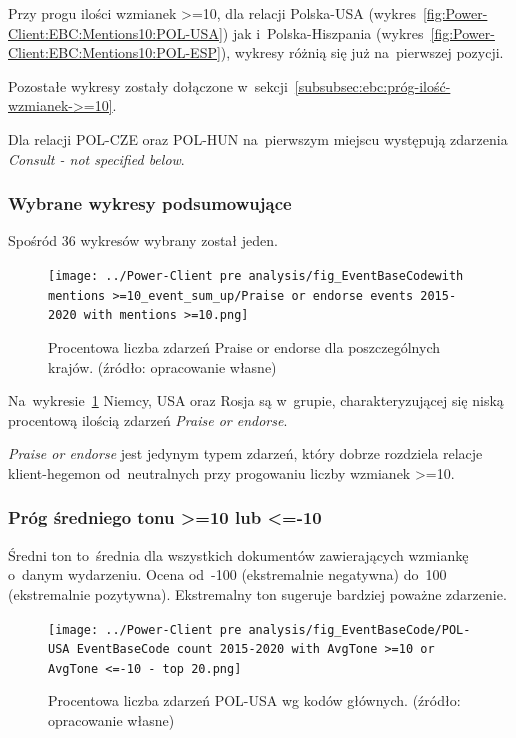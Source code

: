 \documentclass[11pt]{report}
\begin{document}
    Przy progu ilości wzmianek >=10, dla relacji Polska-USA (wykres~\ref{fig:Power-Client:EBC:Mentions10:POL-USA}) jak i~Polska-Hiszpania (wykres~\ref{fig:Power-Client:EBC:Mentions10:POL-ESP}),
    wykresy różnią się już na~pierwszej pozycji.

    Pozostałe wykresy zostały dołączone w~sekcji~\ref{subsubsec:ebc:próg-ilość-wzmianek->=10}.

    Dla relacji POL-CZE oraz POL-HUN na~pierwszym miejscu występują zdarzenia \textit{Consult - not specified below}.

    \subsubsection{Wybrane wykresy podsumowujące}

    Spośród 36 wykresów wybrany został jeden.

    \begin{figure}[tp]
        \centering
        \texttt{[image: ../Power-Client pre analysis/fig\_EventBaseCodewith mentions >=10\_event\_sum\_up/Praise or endorse events 2015-2020 with mentions >=10.png]}
        \caption{Procentowa liczba zdarzeń Praise or endorse dla poszczególnych krajów. (źródło: opracowanie własne)}
        \label{fig:Power-Client:ERC:Mentions10:SumUp:Praise or endorse}
    \end{figure}

    Na~wykresie~\ref{fig:Power-Client:ERC:Mentions10:SumUp:Praise or endorse} Niemcy, USA oraz Rosja są w~grupie,
    charakteryzującej się niską procentową ilością zdarzeń \textit{Praise or endorse}.

    \textit{Praise or endorse} jest jedynym typem zdarzeń, który dobrze rozdziela relacje klient-hegemon od~neutralnych
    przy progowaniu liczby wzmianek >=10.

    \subsubsection{Próg średniego tonu >=10 lub <=-10}
    Średni ton to~średnia dla wszystkich dokumentów zawierających wzmiankę o~danym wydarzeniu.
    Ocena od~-100 (ekstremalnie negatywna) do~100 (ekstremalnie pozytywna).
    Ekstremalny ton sugeruje bardziej poważne zdarzenie.

    \begin{figure}[tp]
        \centering
        \texttt{[image: ../Power-Client pre analysis/fig\_EventBaseCode/POL-USA EventBaseCode count 2015-2020 with AvgTone >=10 or AvgTone <=-10 - top 20.png]}
        \caption{Procentowa liczba zdarzeń POL-USA wg kodów głównych. (źródło: opracowanie własne)}
        \label{fig:Power-Client:EBC:AvgToone10:POL-USA}
    \end{figure}
\end{document}
